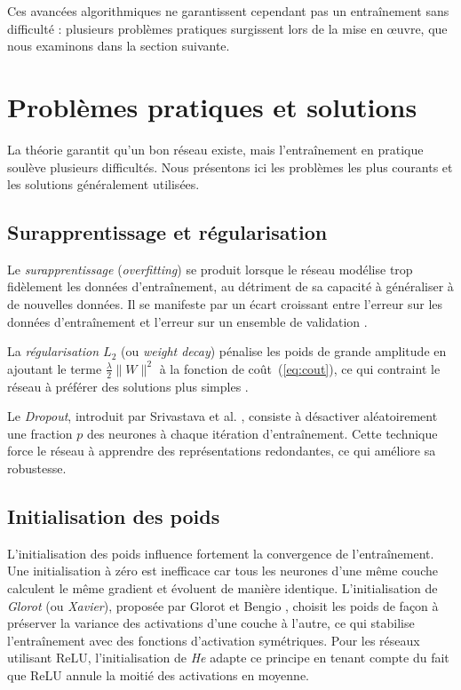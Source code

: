 \documentclass[a4paper,french]{style-LaTeX}
\begin{document}
Ces avancées algorithmiques ne garantissent cependant pas un entraînement sans difficulté : plusieurs problèmes pratiques surgissent lors de la mise en œuvre, que nous examinons dans la section suivante.


\section{Problèmes pratiques et solutions}

La théorie garantit qu'un bon réseau existe, mais l'entraînement en pratique soulève plusieurs difficultés. Nous présentons ici les problèmes les plus courants et les solutions généralement utilisées.

\subsection*{Surapprentissage et régularisation}

Le \emph{surapprentissage} (\emph{overfitting}) se produit lorsque le réseau modélise trop fidèlement les données d'entraînement, au détriment de sa capacité à généraliser à de nouvelles données. Il se manifeste par un écart croissant entre l'erreur sur les données d'entraînement et l'erreur sur un ensemble de validation \cite{Goodfellow16}.

La \emph{régularisation $L_2$} (ou \emph{weight decay}) pénalise les poids de grande amplitude en ajoutant le terme $\frac{\lambda}{2} \|W\|^2$ à la fonction de coût~(\ref{eq:cout}), ce qui contraint le réseau à préférer des solutions plus simples \cite{Goodfellow16}.

Le \emph{Dropout}, introduit par Srivastava et al. \cite{Srivastava14}, consiste à désactiver aléatoirement une fraction $p$ des neurones à chaque itération d'entraînement. Cette technique force le réseau à apprendre des représentations redondantes, ce qui améliore sa robustesse.

\subsection*{Initialisation des poids}

L'initialisation des poids influence fortement la convergence de l'entraînement. Une initialisation à zéro est inefficace car tous les neurones d'une même couche calculent le même gradient et évoluent de manière identique. L'initialisation de \emph{Glorot} (ou \emph{Xavier}), proposée par Glorot et Bengio \cite{GlorotBengio10}, choisit les poids de façon à préserver la variance des activations d'une couche à l'autre, ce qui stabilise l'entraînement avec des fonctions d'activation symétriques. Pour les réseaux utilisant $\mathrm{ReLU}$, l'initialisation de \emph{He} \cite{He15} adapte ce principe en tenant compte du fait que ReLU annule la moitié des activations en moyenne.
\end{document}
